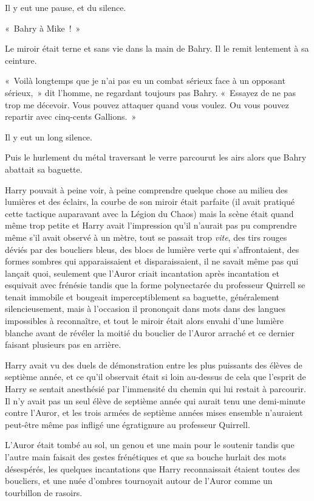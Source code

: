 Il y eut une pause, et du silence.

«~Bahry à Mike~!~»

Le miroir était terne et sans vie dans la main de Bahry.
Il le remit lentement à sa ceinture.

«~Voilà longtemps que je n'ai pas eu un combat sérieux face à un opposant sérieux,~» dit l'homme, ne regardant toujours pas Bahry.
«~Essayez de ne pas trop me décevoir.
Vous pouvez attaquer quand vous voulez.
Ou vous pouvez repartir avec cinq-cents Gallions.~»

Il y eut un long silence.

Puis le hurlement du métal traversant le verre parcourut les airs alors que Bahry abattait sa baguette.

\later

Harry pouvait à peine voir, à peine comprendre quelque chose au milieu des lumières et des éclairs, la courbe de son miroir était parfaite (il avait pratiqué cette tactique auparavant avec la Légion du Chaos) mais la scène était quand même trop petite et Harry avait l'impression qu'il n'aurait pas pu comprendre même s'il avait observé à un mètre, tout se passait trop \emph{vite}, des tirs rouges déviés par des boucliers bleus, des blocs de lumière verte qui s'affrontaient, des formes sombres qui apparaissaient et disparaissaient, il ne savait même pas qui lançait quoi, seulement que l'Auror criait incantation après incantation et esquivait avec frénésie tandis que la forme polynectarée du professeur Quirrell se tenait immobile et bougeait imperceptiblement sa baguette, généralement silencieusement, mais à l'occasion il prononçait dans mots dans des langues impossibles à reconnaître, et tout le miroir était alors envahi d'une lumière blanche avant de révéler la moitié du bouclier de l'Auror arraché et ce dernier faisant plusieurs pas en arrière.

Harry avait vu des duels de démonstration entre les plus puissants des élèves de septième année, et ce qu'il observait était si loin au-dessus de cela que l'esprit de Harry se sentait anesthésié par l'immensité du chemin qui lui restait à parcourir.
Il n'y avait pas un seul élève de septième année qui aurait tenu une demi-minute contre l'Auror, et les trois armées de septième années mises ensemble n'auraient peut-être même pas infligé une égratignure au professeur Quirrell.

L'Auror était tombé au sol, un genou et une main pour le soutenir tandis que l'autre main faisait des gestes frénétiques et que sa bouche hurlait des mots désespérés, les quelques incantations que Harry reconnaissait étaient toutes des boucliers, et une nuée d'ombres tournoyait autour de l'Auror comme un tourbillon de rasoirs.

